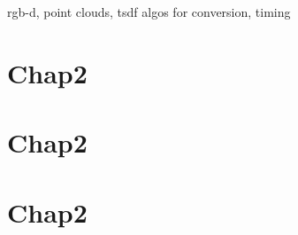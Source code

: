 rgb-d, point clouds, tsdf
algos for conversion, timing


\chapter{Chap2}
\label{cha:chap3}


\chapter{Chap2}
\label{cha:chap4}


\chapter{Chap2}
\label{cha:chap5}